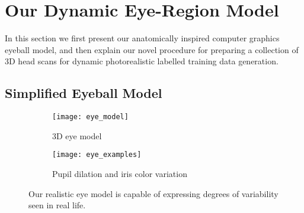 


\section{Our Dynamic Eye-Region Model}




In this section we first present our anatomically inspired computer graphics eyeball model, and then explain our novel procedure for preparing a collection of 3D head scans for dynamic photorealistic labelled training data generation.

\subsection{Simplified Eyeball Model}
\label{subsec:eyeball_model}

\begin{figure}
    \centering
    \begin{subfigure}[t]{0.33\columnwidth}
        \texttt{[image: eye\_model]}
        \caption{3D eye model}
        \label{fig:3d_eye_model}
    \end{subfigure}%
    \hfill
    \begin{subfigure}[t]{0.65\columnwidth}
        \texttt{[image: eye\_examples]}
        \caption{Pupil dilation and iris color variation}
    \end{subfigure}
    \caption{Our realistic eye model is capable of expressing degrees of variability seen in real life.}
    \label{fig:eye_model}
\end{figure}


